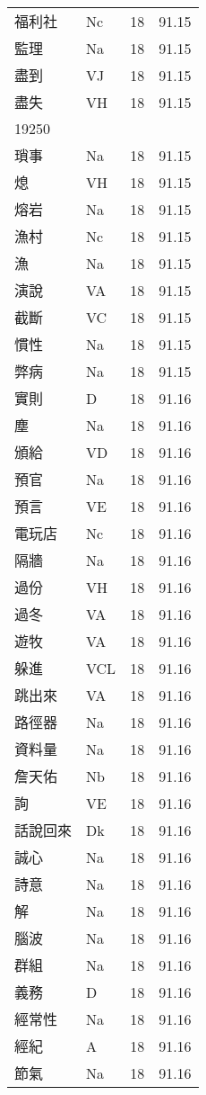 \documentclass[twocolumn]{book}
\begin{document}
\begin{supertabular}{llrr}
福利社 & Nc & 18 &  91.15\\
監理 & Na & 18 &  91.15\\
盡到 & VJ & 18 &  91.15\\
盡失 & VH & 18 &  91.15\\
19250\\
瑣事 & Na & 18 &  91.15\\
熄 & VH & 18 &  91.15\\
熔岩 & Na & 18 &  91.15\\
漁村 & Nc & 18 &  91.15\\
漁 & Na & 18 &  91.15\\
演說 & VA & 18 &  91.15\\
截斷 & VC & 18 &  91.15\\
慣性 & Na & 18 &  91.15\\
弊病 & Na & 18 &  91.15\\
實則 & D & 18 &  91.16\\
塵 & Na & 18 &  91.16\\
頒給 & VD & 18 &  91.16\\
預官 & Na & 18 &  91.16\\
預言 & VE & 18 &  91.16\\
電玩店 & Nc & 18 &  91.16\\
隔牆 & Na & 18 &  91.16\\
過份 & VH & 18 &  91.16\\
過冬 & VA & 18 &  91.16\\
遊牧 & VA & 18 &  91.16\\
躲進 & VCL & 18 &  91.16\\
跳出來 & VA & 18 &  91.16\\
路徑器 & Na & 18 &  91.16\\
資料量 & Na & 18 &  91.16\\
詹天佑 & Nb & 18 &  91.16\\
詢 & VE & 18 &  91.16\\
話說回來 & Dk & 18 &  91.16\\
誠心 & Na & 18 &  91.16\\
詩意 & Na & 18 &  91.16\\
解 & Na & 18 &  91.16\\
腦波 & Na & 18 &  91.16\\
群組 & Na & 18 &  91.16\\
義務 & D & 18 &  91.16\\
經常性 & Na & 18 &  91.16\\
經紀 & A & 18 &  91.16\\
節氣 & Na & 18 &  91.16\\

\end{supertabular}
\end{document}
